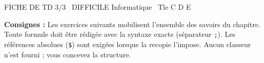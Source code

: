 \documentclass[11pt]{article}
\begin{document}
\begin{tcolorbox}[enhanced,colback=popink,colframe=popink,arc=10pt,boxrule=0pt,left=12pt,right=12pt,top=9pt,bottom=9pt]
{\color{white}\popxbold\small FICHE DE TD 3/3 \textbullet\ DIFFICILE \hfill Informatique \textbullet\ Tle C D E\par}
\end{tcolorbox}
\vspace{4pt}
\noindent \textbf{Consignes :} Les exercices suivants mobilisent l'ensemble des savoirs du chapitre. Toute formule doit être rédigée avec la syntaxe exacte (séparateur \texttt{;}). Les références absolues (\texttt{\$}) sont exigées lorsque la recopie l'impose. Aucun classeur n'est fourni ; vous concevez la structure.
\end{document}
